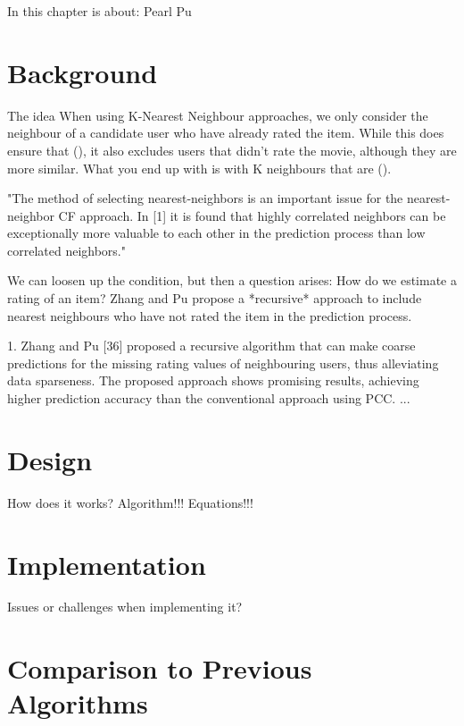 In this chapter is about: Pearl Pu

\section{Background}
The idea
When using K-Nearest Neighbour approaches, we only consider the neighbour of a candidate user who have already rated the item. While this does ensure that (), it also excludes users that didn't rate the movie, although they are more similar. What you end up with is with K neighbours that are ().

"The method of selecting nearest-neighbors is an important
issue for the nearest-neighbor CF approach. In [1] it is found
that highly correlated neighbors can be exceptionally more
valuable to each other in the prediction process than low correlated neighbors."

We can loosen up the condition, but then a question arises: How do we estimate a rating of an item?
Zhang and Pu \cite{pearlpu} propose a *recursive* approach to include nearest neighbours who have not rated the item in the prediction process.



1. Zhang and Pu [36] proposed a recursive algorithm that can make coarse predictions for the missing rating values of neighbouring users, thus alleviating data sparseness. The proposed approach shows promising results, achieving higher prediction accuracy than the conventional approach using PCC. ...


\section{Design}
How does it works?
Algorithm!!!
Equations!!!

\section{Implementation}
Issues or challenges when implementing it?

\section{Comparison to Previous Algorithms}